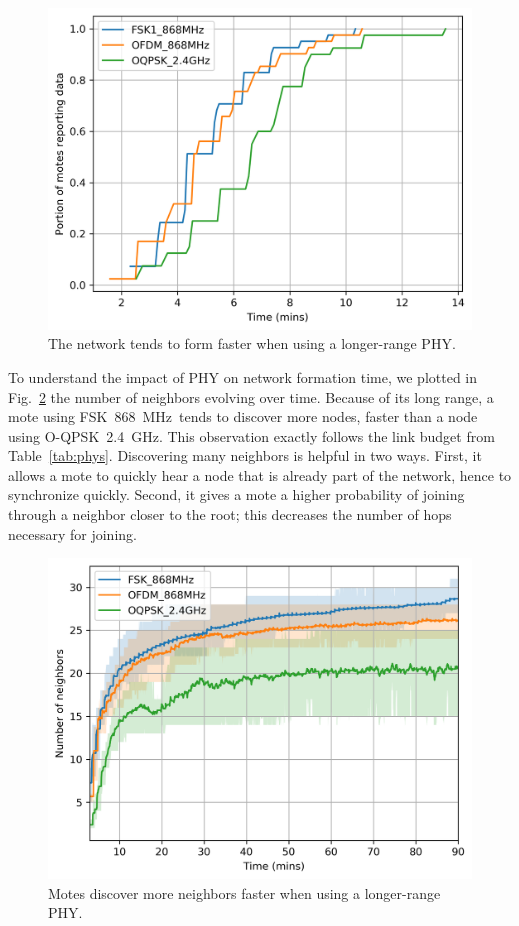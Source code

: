 \documentclass[sensors,article,submit,moreauthors,pdftex]{Definitions/mdpi}
\newcommand{\fsk}           {FSK~868~MHz}
\newcommand{\oqpsk}         {O-QPSK~2.4~GHz}
\newcommand{\figwidth}      {0.80}
\begin{document}
\begin{figure}
	\centering
	\includegraphics[width=\figwidth\columnwidth]{time_firstpacket_cdf}
	\caption{The network tends to form faster when using a longer-range PHY.}
    \label{fig:time_firstpacket_cdf}
\end{figure}


To understand the impact of PHY on network formation time, we plotted in Fig.~\ref{fig:neighbors_time} the number of neighbors evolving over time.
Because of its long range, a mote using \fsk\ tends to discover more nodes, faster than a node using \oqpsk.
This observation exactly follows the link budget from Table~\ref{tab:phys}.
Discovering many neighbors is helpful in two ways.
First, it allows a mote to quickly hear a node that is already part of the network,
    hence to synchronize quickly.
Second, it gives a mote a higher probability of joining through a neighbor closer to the root; this decreases the number of hops necessary for joining.

\begin{figure}
	\centering
	\includegraphics[width=0.85\columnwidth]{neighbors_time}
    \caption{Motes discover more neighbors faster when using a longer-range PHY.}
    \label{fig:neighbors_time}
\end{figure}
\end{document}
